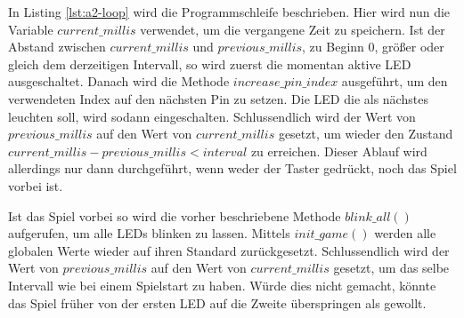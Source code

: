 In Listing \ref{lst:a2-loop} wird die Programmschleife beschrieben.
Hier wird nun die Variable $current\_millis$ verwendet, um die vergangene Zeit zu speichern.
Ist der Abstand zwischen $current\_millis$ und $previous\_millis$, zu Beginn 0, größer oder gleich dem derzeitigen Intervall, so wird zuerst die momentan aktive LED ausgeschaltet.
Danach wird die Methode $increase\_pin\_index$ ausgeführt, um den verwendeten Index auf den nächsten Pin zu setzen.
Die LED die als nächstes leuchten soll, wird sodann eingeschalten.
Schlussendlich wird der Wert von $previous\_millis$ auf den Wert von $current\_millis$ gesetzt, um wieder den Zustand $current\_millis - previous\_millis < interval$ zu erreichen.
Dieser Ablauf wird allerdings nur dann durchgeführt, wenn weder der Taster gedrückt, noch das Spiel vorbei ist.

Ist das Spiel vorbei so wird die vorher beschriebene Methode $blink\_all()$ aufgerufen, um alle LEDs blinken zu lassen.
Mittels $init\_game()$ werden alle globalen Werte wieder auf ihren Standard zurückgesetzt.
Schlussendlich wird der Wert von $previous\_millis$ auf den Wert von $current\_millis$ gesetzt, um das selbe Intervall wie bei einem Spielstart zu haben.
Würde dies nicht gemacht, könnte das Spiel früher von der ersten LED auf die Zweite überspringen als gewollt.


